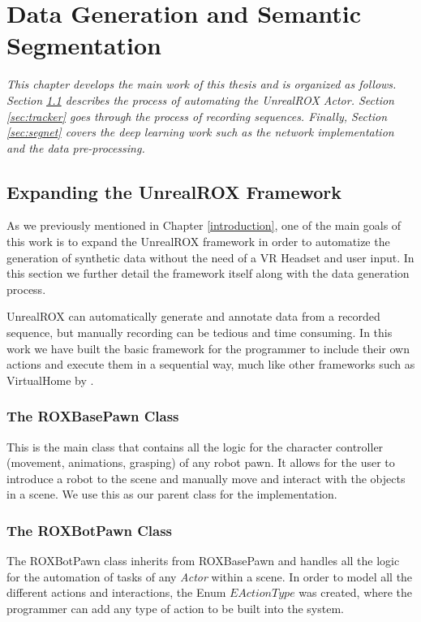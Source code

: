 
\chapter{Data Generation and Semantic Segmentation}
\label{desarrollo}
\textit{This chapter develops the main work of this thesis and is organized as follows. Section \ref{sec:expanding} describes the process of automating the UnrealROX Actor. Section \ref{sec:tracker} goes through the process of recording sequences. Finally, Section \ref{sec:segnet} covers the deep learning work such as the network implementation and the data pre-processing.  }

\section{Expanding the UnrealROX Framework}
\label{sec:expanding}
As we previously mentioned in Chapter \ref{introduction}, one of the main goals of this work is to expand the UnrealROX framework in order to automatize the generation of synthetic data without the need of a VR Headset and user input. In this section we further detail the framework itself along with the data generation process.

UnrealROX can automatically generate and annotate data from a recorded sequence, but manually recording can be tedious and time consuming. In this work we have built the basic framework for the programmer to include their own actions and execute them in a sequential way, much like other frameworks such as VirtualHome by \cite{virtualhome2018}. 

\subsection{The ROXBasePawn Class}
This is the main class that contains all the logic for the character controller (movement, animations, grasping) of any robot pawn. It allows for the user to introduce a robot to the scene and manually move and interact with the objects in a scene. We use this as our parent class for the implementation.

\subsection{The ROXBotPawn Class}
The ROXBotPawn class inherits from ROXBasePawn and handles all the logic for the automation of tasks of any \textit{Actor} within a scene. In order to model all the different actions and interactions, the Enum $EActionType$ was created, where the programmer can add any type of action to be built into the system.

